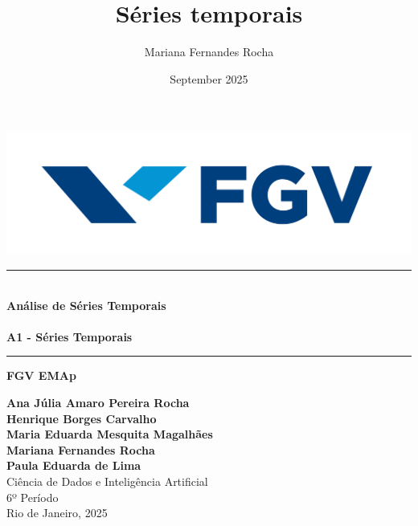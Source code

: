 \documentclass{article}
\title{Séries temporais}
\author{Mariana Fernandes Rocha}
\date{September 2025}
\begin{document}
\begin{titlepage}
    \begin{center}

        \vspace{1cm}
        \begin{minipage}{0.45\textwidth}
            \centering
            \includegraphics[width=1.2\textwidth]{images/logo_fgv.png}    
        \end{minipage}
        \vspace{2cm}

        \rule{1\textwidth}{0.4pt} \\ %
        \vspace{0.3cm}
        {\Huge \textbf{Análise de Séries Temporais}} \\
        \vspace{0.2cm}
        \vspace{0.5cm}\\
        {\Large \textbf{A1 - Séries Temporais}}\\
        \rule{1\textwidth}{0.4pt} %


        \vspace{0.5cm}
        {\Large \textbf{FGV EMAp}} \\
        \vspace{2cm}
        
        

        
        
        
        {\large 
            \textbf{Ana Júlia Amaro Pereira Rocha} \\ 
            \textbf{Henrique Borges Carvalho} \\
            \textbf{Maria Eduarda Mesquita Magalhães}\\
            \textbf{Mariana Fernandes Rocha} \\
            \textbf{Paula Eduarda de Lima}}\\[1.5cm]
        
        {\large 
            Ciência de Dados e Inteligência Artificial \\ 
            6º Período}\\[2cm]
        
        \vfill
        {\large Rio de Janeiro, 2025}

        
    \end{center}
\end{titlepage}
\end{document}
